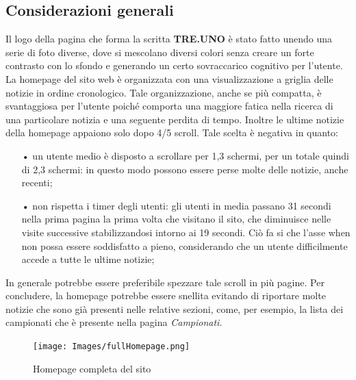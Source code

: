 	\subsection{Considerazioni generali}
	Il logo della pagina che forma la scritta \textbf{TRE.UNO} è stato fatto 
	unendo una serie di foto diverse, dove si mescolano diversi colori senza 
	creare un forte contrasto con lo sfondo e generando un certo sovraccarico 
	cognitivo per l'utente.
	La homepage del sito web è organizzata con una visualizzazione a griglia delle
	notizie in ordine cronologico. Tale organizzazione, anche se più compatta, è
	svantaggiosa per l'utente poiché comporta una maggiore fatica nella ricerca di
	una	particolare notizia e una seguente perdita di tempo.
	Inoltre le ultime notizie della homepage appaiono solo dopo 4/5 scroll. Tale 
	scelta è negativa in quanto:
	\begin{itemize}
		\item[•]un utente medio è disposto a scrollare per 1,3 schermi, per un totale
		 quindi di 2,3 schermi: in questo modo possono essere perse molte delle
		 notizie, anche recenti;
		\item[•]non rispetta i timer degli utenti: gli utenti in media passano 31
		  secondi nella prima pagina la prima volta che visitano il sito, che
		  diminuisce nelle visite successive stabilizzandosi intorno ai 19 secondi.
		  Ciò fa si che l'asse when non possa essere soddisfatto a pieno,
  		  considerando che un utente difficilmente accede a tutte le ultime notizie;
	\end{itemize}	
	In generale potrebbe essere preferibile spezzare tale scroll in più pagine.
	Per concludere, la homepage potrebbe essere snellita evitando di riportare molte
	notizie che sono già presenti nelle relative sezioni, come, per esempio, la lista
	dei campionati che è presente nella pagina \textit{Campionati}.
	
	\begin{figure}[H]
	\centering
	\texttt{[image: Images/fullHomepage.png]}
	\caption{Homepage completa del sito}
	\end{figure}
	
	
	
	
	
	
	
	
	
	
	
	
	
	
	
	
	
